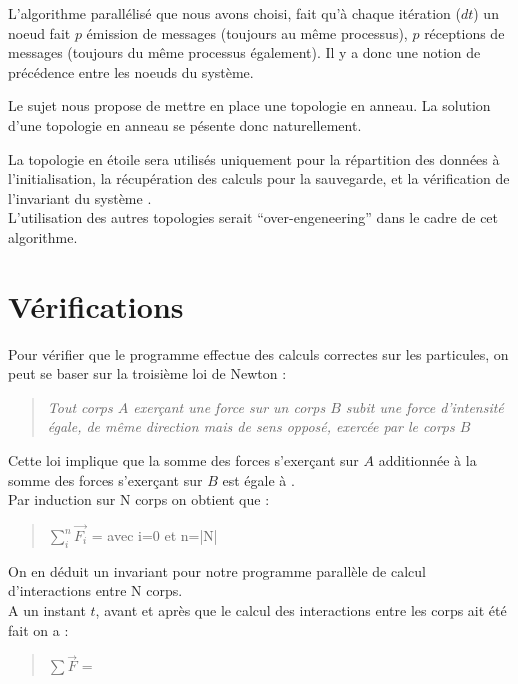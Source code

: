\par L'algorithme parallélisé que nous avons choisi, fait qu'à chaque itération ($dt$) un 
noeud fait $p$ émission de messages (toujours au même processus), $p$ réceptions de messages
(toujours du même processus également). Il y a donc une notion de précédence entre les
noeuds du système.\\

\par Le sujet nous propose de mettre en place une topologie en anneau.
 La solution d'une topologie en anneau se pésente donc naturellement.\\

\par La topologie en étoile sera utilisés uniquement pour la répartition des données à 
l'initialisation, la récupération des calculs pour la sauvegarde, et la vérification de
l'invariant du système .\\ 
L'utilisation des autres topologies serait ``over-engeneering'' dans le cadre de cet
algorithme.

\section{Vérifications}

\par Pour vérifier que le programme effectue des calculs correctes sur les particules, 
on peut se baser sur la troisième loi de Newton :
\begin{quote}
\textit{Tout corps $A$ exerçant une force sur un corps $B$ subit 
une force d'intensité égale, de même direction mais de sens opposé, exercée par le corps $B$}
\end{quote}

\par Cette loi implique que la somme des forces s'exerçant sur $A$ additionnée à la somme des forces 
s'exerçant sur $B$ est égale à  .\\
Par induction sur N corps on obtient que :
\begin{quote}
  \begin{center}
    $\sum_{i}^{n} \overrightarrow{F_{i}}$ =  avec i=0 et n=|N| 
  \end{center}
\end{quote}

\par On en déduit un invariant pour notre programme parallèle de calcul d'interactions entre N corps.\\
A un instant $t$, avant et après que le calcul des interactions entre les corps ait été fait on a :
\begin{quote}
  \begin{center}
    $\sum \overrightarrow{F}$ = 
  \end{center}
\end{quote}

